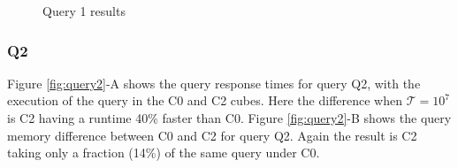 \begin{figure}[H]
  \caption{Query 1 results}\label{fig:query1}
  \vspace{6mm}
  \begin{center}
  \end{center}
  \vspace{2mm}
\end{figure}

\hypertarget{q2-1}{%
\subsubsection{Q2}\label{q2-1}}

Figure \ref{fig:query2}-A shows the query response times for query Q2, with the execution of the query in the C0 and C2 cubes.
Here the difference when \(\mathcal{T} =\ensuremath{10^{7}}\) is C2 having a runtime 40\% faster than C0.
Figure \ref{fig:query2}-B shows the query memory difference between C0 and C2 for query Q2.
Again the result is C2 taking only a fraction (14\%) of the same query under C0.

